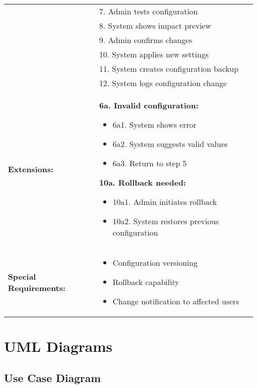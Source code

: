 \documentclass[12pt]{article}
\begin{document}
\begin{longtable}{|p{3cm}|p{11cm}|}
& 7. Admin tests configuration \\
& 8. System shows impact preview \\
& 9. Admin confirms changes \\
& 10. System applies new settings \\
& 11. System creates configuration backup \\
& 12. System logs configuration change \\
\hline
\textbf{Extensions:} & 
\textbf{6a. Invalid configuration:}
\begin{itemize}
    \item 6a1. System shows error
    \item 6a2. System suggests valid values
    \item 6a3. Return to step 5
\end{itemize}
\textbf{10a. Rollback needed:}
\begin{itemize}
    \item 10a1. Admin initiates rollback
    \item 10a2. System restores previous configuration
\end{itemize} \\
\hline
\textbf{Special Requirements:} & 
\begin{itemize}
    \item Configuration versioning
    \item Rollback capability
    \item Change notification to affected users
\end{itemize} \\
\hline
\end{longtable}




\section{UML Diagrams}

\subsection{Use Case Diagram}
\end{document}
